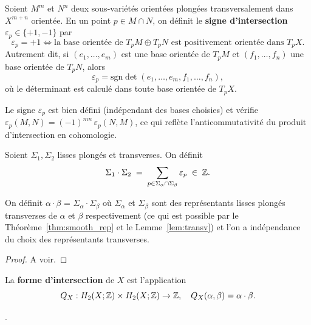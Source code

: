 \begin{definition}
Soient $M^m$ et $N^n$ deux sous-variétés orientées plongées transversalement dans $X^{m+n}$ orientée. En un point $p \in M \cap N$, on définit le \textbf{signe d'intersection} $\varepsilon_p \in \{+1, -1\}$ par
\[
  \varepsilon_p = +1 \iff \text{la base orientée de } T_p M \oplus T_p N \text{ est positivement orientée dans } T_p X.
\]
Autrement dit, si $(e_1, \ldots, e_m)$ est une base orientée de $T_pM$ et $(f_1, \ldots, f_n)$ une base orientée de $T_pN$, alors
\[
  \varepsilon_p = \mathrm{sgn}\det(e_1, \ldots, e_m, f_1, \ldots, f_n),
\]
où le déterminant est calculé dans toute base orientée de $T_pX$.
\end{definition}

\begin{remark}
Le signe $\varepsilon_p$ est bien défini (indépendant des bases choisies) et vérifie $\varepsilon_p(M, N) = (-1)^{mn}\, \varepsilon_p(N, M)$, ce qui reflète l'anticommutativité du produit d'intersection en cohomologie.
\end{remark}



\begin{definition}
\label{def:intersection_number}
Soient $\Sigma_1, \Sigma_2$ lisses plongés et transverses. On définit
\[
  \Sigma_1 \cdot \Sigma_2 \;=\; \sum_{p \in \Sigma_\alpha \cap \Sigma_\beta} \varepsilon_p \;\in\;\mathbb{Z}.
\]
\end{definition}

\begin{definition}
\label{lem:welldefined}
On définit $\alpha \cdot \beta$ = $\Sigma_\alpha \cdot \Sigma_\beta$ où $\Sigma_\alpha$ et $\Sigma_\beta$ sont des représentants lisses plongés transverses de $\alpha$ et $\beta$ respectivement (ce qui est possible par le Théorème~\ref{thm:smooth_rep} et le Lemme~\ref{lem:transv}) et l'on a indépendance du choix des représentants transverses.
\end{definition}
\begin{proof}
A voir.
\end{proof}

\begin{definition}
La \textbf{forme d'intersection} de $X$ est l'application
\[
  Q_X : H_2(X;\mathbb{Z}) \times H_2(X;\mathbb{Z}) \to \mathbb{Z}, \quad Q_X(\alpha,\beta) = \alpha \cdot \beta.
\]

.
\end{definition}




